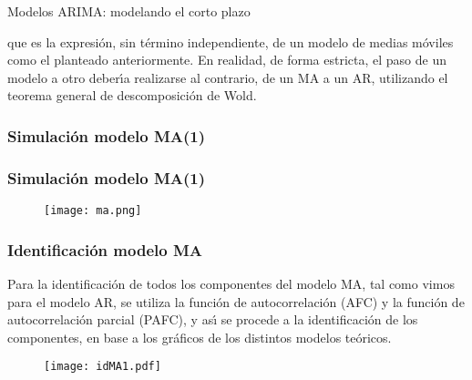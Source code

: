 \documentclass[spanish,xcolor=table]{beamer}
\begin{document}
\begin{section}{Modelos ARIMA: modelando el corto plazo}
\begin{frame}
que es la expresi\'on, sin t\'ermino independiente, de un modelo de medias m\'oviles como el planteado anteriormente. En realidad, de forma estricta, el paso de un modelo a otro deber\'{\i}a realizarse al contrario, de un MA a un AR, utilizando el teorema general de descomposici\'on de Wold.

\end{frame}

\begin{frame}
\frametitle{Simulaci\'on modelo MA(1) }


\end{frame}
\begin{frame}
\frametitle{Simulaci\'on modelo MA(1) }

\begin{figure}[t!]
\texttt{[image: ma.png]}
\end{figure}
 
\end{frame}

\begin{frame}
\frametitle{Identificaci\'on modelo MA }

Para la identificaci\'on de todos los componentes del modelo MA, tal como vimos para el modelo AR, se utiliza la funci\'on de autocorrelaci\'on (AFC) y la funci\'on de autocorrelaci\'on parcial (PAFC), y as\'{\i} se procede a la identificaci\'on de los componentes, en base a los gr\'aficos de los distintos modelos te\'oricos.

\begin{figure}[t!]
\texttt{[image: idMA1.pdf]}
\end{figure}



\end{frame}
\end{section}
\end{document}
